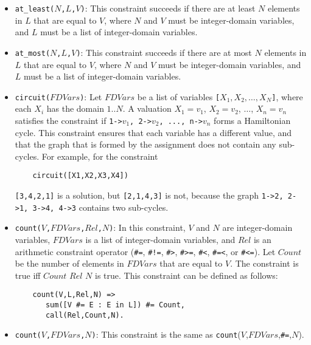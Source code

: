 \begin{itemize}
\item \texttt{at\_least($N$,$L$,$V$)}: This constraint succeeds if there are at least $N$ elements in $L$ that are equal to $V$, where $N$ and $V$ must be integer-domain variables, and $L$ must be a list of integer-domain variables.

\item \texttt{at\_most($N$,$L$,$V$)}: This constraint succeeds if there are at most $N$ elements in $L$ that are equal to $V$, where $N$ and $V$ must be integer-domain variables, and $L$ must be a list of integer-domain variables.

\item \texttt{circuit($FDVars$)}: Let $FDVars$ be a list of variables \texttt{[$X_1,X_2,\ldots,X_N$]}, where each \texttt{$X_i$} has the domain $1..N$. A valuation $X_1=v_1$, $X_2=v_2$, $\ldots$, $X_n=v_n$ satisfies the constraint if \texttt{1->$v_1$, 2->$v_2$, ..., n->$v_n$} forms a Hamiltonian cycle. This constraint ensures that each variable has a different value, and that the graph that is formed by the assignment does not contain any sub-cycles. For example, for the constraint 
\begin{verbatim}
    circuit([X1,X2,X3,X4])
\end{verbatim}
\texttt{[3,4,2,1]} is a solution, but \texttt{[2,1,4,3]} is not, because the graph \texttt{1->2, 2->1, 3->4, 4->3} contains two sub-cycles.
\item \texttt{count($V$,$FDVars$,$Rel$,$N$)}:  In this constraint, $V$ and $N$ are integer-domain variables, $FDVars$ is a list of integer-domain variables, and $Rel$ is an arithmetic constraint operator (\verb+#=+,  \verb+#!=+,  \verb+#>+,  \verb+#>=+,  \verb+#<+,  \verb+#=<+, or \verb+#<=+). Let $Count$ be the number of elements in $FDVars$ that are equal to $V$. The constraint is true iff $Count$ $Rel$ $N$ is true. This constraint can be defined as follows:
\begin{verbatim}
    count(V,L,Rel,N) =>
       sum([V #= E : E in L]) #= Count,
       call(Rel,Count,N).
\end{verbatim}
\item \texttt{count($V$,$FDVars$,$N$)}: This constraint is the same as \texttt{count}($V$,$FDVars$,\verb+#=+,$N$).


\end{itemize}
